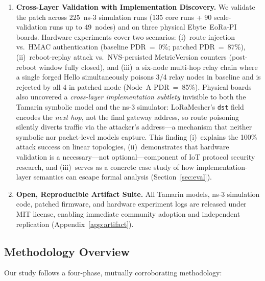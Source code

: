 \documentclass[10pt,journal,compsoc]{IEEEtran}
\begin{document}
\begin{enumerate}
  \item \textbf{Cross-Layer Validation with Implementation Discovery.}
    We validate the patch across 225~ns-3 simulation runs
    (135 core runs + 90 scale-validation runs up to 49~nodes)
    and on three physical Ebyte~EoRa-PI boards.
    Hardware experiments cover two scenarios: (i)~route injection
    vs.\ HMAC authentication (baseline PDR~=~0\%; patched PDR~=~87\%),
    (ii)~reboot-replay attack vs.\ NVS-persisted MetricVersion
    counters (post-reboot window fully closed), and
    (iii)~a six-node multi-hop relay chain where a single forged
    Hello simultaneously poisons 3/4 relay nodes in baseline and
    is rejected by all 4 in patched mode (Node~A PDR~=~85\%).
    Physical boards also uncovered a \emph{cross-layer implementation
    subtlety} invisible to both the Tamarin symbolic model and the
    ns-3 simulator: LoRaMesher's \texttt{dst} field encodes the
    \emph{next hop}, not the final gateway address, so route poisoning
    silently diverts traffic via the attacker's address—a mechanism
    that neither symbolic nor packet-level models capture.
    This finding (i)~explains the 100\% attack success on linear
    topologies, (ii)~demonstrates that hardware validation is a
    necessary—not optional—component of IoT protocol security research,
    and (iii)~serves as a concrete case study of how implementation-layer
    semantics can escape formal analysis
    (Section~\ref{sec:eval}).

  \item \textbf{Open, Reproducible Artifact Suite.} All Tamarin
    models, ns-3 simulation code, patched firmware, and hardware
    experiment logs are released under MIT license, enabling
    immediate community adoption and independent replication
    (Appendix~\ref{app:artifact}).
\end{enumerate}

\subsection{Methodology Overview}
\label{sec:methodology}

Our study follows a four-phase, mutually corroborating methodology:
\end{document}
